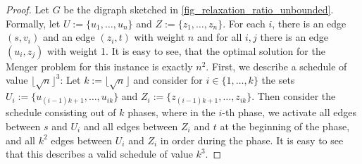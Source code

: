 \documentclass[runningheads]{llncs}
\numberwithin{equation}{section}
\newcommand{\set}[1]{\{ #1 \}}
\newcommand{\fromto}[2]{\set{#1, \ldots, #2}}
\begin{document}
\begin{proof}
Let $G$ be the digraph sketched in \cref{fig_relaxation_ratio_unbounded}. Formally,  let $U := \fromto{u_1}{u_n}$ and $Z := \fromto{z_1}{z_n}$. For each $i$, there is an edge $(s,v_i)$ and  an edge $(z_i, t)$ with weight $n$ and for all $i, j$ there is an edge $(u_i, z_j)$ with weight 1. It is easy to see, that the optimal solution for the Menger problem for this instance is exactly $n^2$.
 First, we describe a schedule of value $\lfloor \sqrt{n} \rfloor^3$: Let $k := \lfloor \sqrt{n} \rfloor$ and consider for $i \in \fromto{1}{k}$ the sets $U_i := \fromto{u_{(i-1)k+1}}{u_{ik}}$ and $Z_i := \fromto{z_{(i-1)k+1}}{z_{ik}}$. Then consider the schedule consisting out of $k$ phases, where in the $i$-th phase, we activate all edges between $s$ and $U_i$ and all edges between $Z_i$ and $t$ at the beginning of the phase, and all $k^2$ edges between $U_i$ and $Z_i$ in order during the phase. It is easy to see that this describes a valid schedule of value $k^3$.
 

\end{proof}
\end{document}
